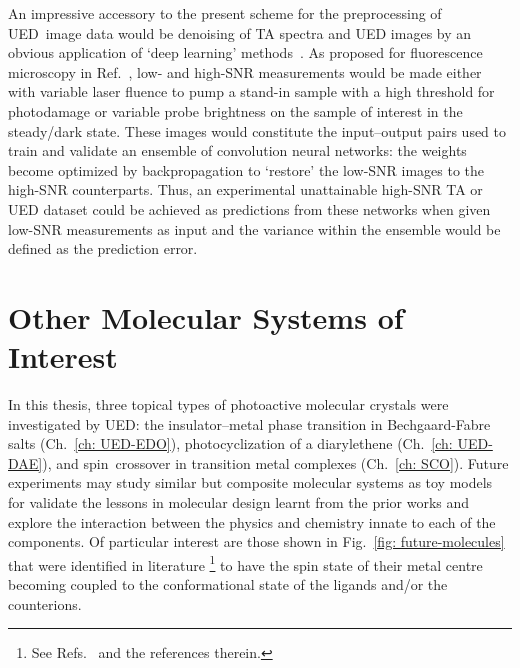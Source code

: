An impressive accessory to the present scheme for the preprocessing of UED~image data
would be denoising of TA spectra and UED images by an obvious application
of `deep learning' methods~\cite{LeCun2015}.
%
As proposed for fluorescence microscopy in Ref.~\cite{Weigert2018},
low- and high-SNR measurements would be made either with variable laser fluence
to pump a stand-in sample with a high threshold for photodamage or
variable probe brightness on the sample of interest in the steady/dark state.
%
These images would constitute the input--output pairs used to train and validate
an ensemble of convolution neural networks:
the weights become optimized by backpropagation to `restore' the low-SNR images
to the high-SNR counterparts.
%
Thus, an experimental unattainable high-SNR TA or UED dataset could be achieved
as predictions from these networks when given low-SNR measurements as input
and the variance within the ensemble would be defined as the prediction error.


\section[Other Molecular Systems of Interest]{Other Molecular Systems of Interest}
\label{sec: future-molecules}

In this thesis, three topical types of photoactive molecular crystals were investigated by UED:
the insulator--metal phase transition in Bechgaard-Fabre salts (Ch.~\ref{ch: UED-EDO}),
photocyclization of a diarylethene (Ch.~\ref{ch: UED-DAE}), and
spin~crossover in transition metal complexes (Ch.~\ref{ch: SCO}).
%
Future experiments may study similar but composite molecular systems as toy models
for validate the lessons in molecular design learnt from the prior works
and explore the interaction between the physics and chemistry innate to
each of the components.
Of particular interest are those shown in Fig.~\ref{fig: future-molecules}
that were identified in literature%
\footnote{See Refs.~\cite{Brachnakova2018, Chastanet2018} and the references therein.}
to have the spin state of their metal centre becoming coupled to the conformational state
of the ligands and/or the counterions.

